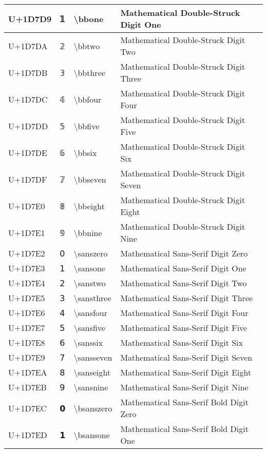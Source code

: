 \begin{table}[h]
\begin{tabulary}{\linewidth}{|L|L|L|L|}
\hline
U+1D7D9 & 𝟙 & {\textbackslash}bbone & Mathematical Double-Struck Digit One \\
\hline
U+1D7DA & 𝟚 & {\textbackslash}bbtwo & Mathematical Double-Struck Digit Two \\
\hline
U+1D7DB & 𝟛 & {\textbackslash}bbthree & Mathematical Double-Struck Digit Three \\
\hline
U+1D7DC & 𝟜 & {\textbackslash}bbfour & Mathematical Double-Struck Digit Four \\
\hline
U+1D7DD & 𝟝 & {\textbackslash}bbfive & Mathematical Double-Struck Digit Five \\
\hline
U+1D7DE & 𝟞 & {\textbackslash}bbsix & Mathematical Double-Struck Digit Six \\
\hline
U+1D7DF & 𝟟 & {\textbackslash}bbseven & Mathematical Double-Struck Digit Seven \\
\hline
U+1D7E0 & 𝟠 & {\textbackslash}bbeight & Mathematical Double-Struck Digit Eight \\
\hline
U+1D7E1 & 𝟡 & {\textbackslash}bbnine & Mathematical Double-Struck Digit Nine \\
\hline
U+1D7E2 & 𝟢 & {\textbackslash}sanszero & Mathematical Sans-Serif Digit Zero \\
\hline
U+1D7E3 & 𝟣 & {\textbackslash}sansone & Mathematical Sans-Serif Digit One \\
\hline
U+1D7E4 & 𝟤 & {\textbackslash}sanstwo & Mathematical Sans-Serif Digit Two \\
\hline
U+1D7E5 & 𝟥 & {\textbackslash}sansthree & Mathematical Sans-Serif Digit Three \\
\hline
U+1D7E6 & 𝟦 & {\textbackslash}sansfour & Mathematical Sans-Serif Digit Four \\
\hline
U+1D7E7 & 𝟧 & {\textbackslash}sansfive & Mathematical Sans-Serif Digit Five \\
\hline
U+1D7E8 & 𝟨 & {\textbackslash}sanssix & Mathematical Sans-Serif Digit Six \\
\hline
U+1D7E9 & 𝟩 & {\textbackslash}sansseven & Mathematical Sans-Serif Digit Seven \\
\hline
U+1D7EA & 𝟪 & {\textbackslash}sanseight & Mathematical Sans-Serif Digit Eight \\
\hline
U+1D7EB & 𝟫 & {\textbackslash}sansnine & Mathematical Sans-Serif Digit Nine \\
\hline
U+1D7EC & 𝟬 & {\textbackslash}bsanszero & Mathematical Sans-Serif Bold Digit Zero \\
\hline
U+1D7ED & 𝟭 & {\textbackslash}bsansone & Mathematical Sans-Serif Bold Digit One \\

\end{tabulary}
\end{table}
